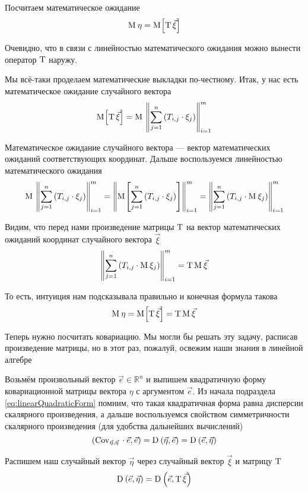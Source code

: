 Посчитаем математическое ожидание
$$\mathrm{M}_{}\,\eta = \mathrm{M}_{}\!\left[ \mathrm{T}\, {\vec{\xi}} \right]$$

Очевидно, что в связи с линейностью математического ожидания можно вынести
оператор $\mathrm{T}$ наружу.

Мы всё-таки проделаем математические выкладки по-честному.
Итак, у нас есть математическое ожидание случайного вектора
$$\mathrm{M}_{}\!\left[ \mathrm{T}\, {\vec{\xi}} \right]
    = \mathrm{M}_{}\,\left\| \sum_{j=1}^n \left( T_{i,j} \cdot \xi_j \right)
        \right\|_{i=1}^m$$

Математическое ожидание случайного вектора --- вектор математических ожиданий
соответствующих координат.
Дальше воспользуемся линейностью математического ожидания
$$\mathrm{M}_{}\,\left\| \sum_{j=1}^n \left( T_{i,j} \cdot \xi_j \right)
        \right\|_{i=1}^m
    = \left\| \mathrm{M}_{}\!\left[ \sum_{j=1}^n \left( T_{i,j} \cdot \xi_j \right) \right]
        \right\|_{i=1}^m
    = \left\| \sum_{j=1}^n \left( T_{i,j} \cdot \mathrm{M}_{}\,\xi_j \right)
        \right\|_{i=1}^m$$

Видим, что перед нами произведение матрицы $\mathrm{T}$ на вектор
математических ожиданий координат случайного вектора $\vec{\xi}$
$$\left\| \sum_{j=1}^n \left( T_{i,j} \cdot \mathrm{M}_{}\,\xi_j \right)
    \right\|_{i=1}^m = \mathrm{T}\, {\mathrm{M}_{}\,\vec{\xi}}$$

То есть, интуиция нам подсказывала правильно и конечная формула такова
$$\mathrm{M}_{}\,\eta
    = \mathrm{M}_{}\!\left[ \mathrm{T}\, {\vec{\xi}} \right]
    = \mathrm{T}\, {\mathrm{M}_{}\,\vec{\xi}}$$

Теперь нужно посчитать ковариацию. Мы могли бы решать эту задачу,
расписав произведение матрицы, но в этот раз, пожалуй, освежим наши знания
в линейной алгебре

Возьмём произвольный вектор $\vec{e} \in \mathbb{R}^n$
и выпишем квадратичную форму ковариационной матрицы вектора $\eta$
с аргументом $\vec{e}$. Из начала подраздела \eqref{eq:linearQuadraticForm}
помним, что такая квадратичная форма равна дисперсии скалярного произведения, а
дальше воспользуемся свойством симметричности скалярного произведения
(для удобства дальнейших вычислений)
$$\left( \mathrm{Cov}_{\vec{\eta}, \vec{\eta}}\, \cdot \vec{e}, \vec{e} \right)
    = \mathrm{D}_{} \left( \vec{\eta}, \vec{e} \right)
    = \mathrm{D}_{} \left( \vec{e}, \vec{\eta} \right)$$

Распишем наш случайный вектор $\vec{\eta}$ через случайный вектор $\vec{\xi}$
и матрицу $\mathrm{T}$
$$\mathrm{D}_{} \left( \vec{e}, \vec{\eta} \right)
    = \mathrm{D}_{} \left( \vec{e}, \mathrm{T}\, {\vec{\xi}} \right)$$

